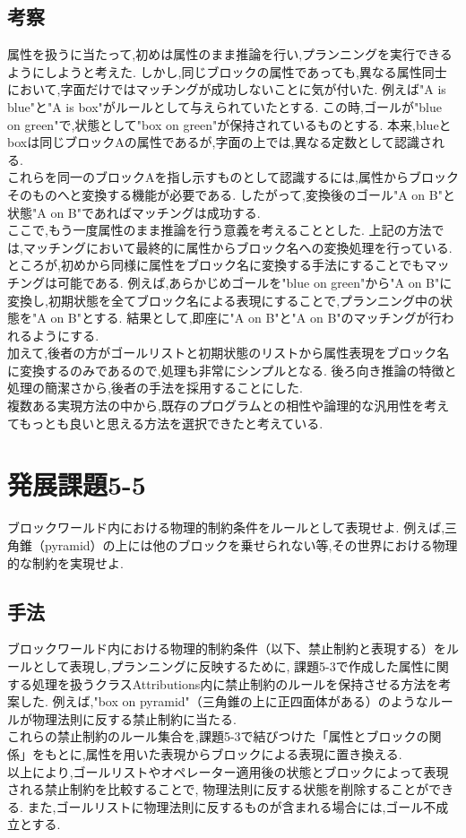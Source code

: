 \documentclass[uplatex,12pt]{jsarticle}
\begin{document}
\subsection{考察}
属性を扱うに当たって,初めは属性のまま推論を行い,プランニングを実行できるようにしようと考えた.
しかし,同じブロックの属性であっても,異なる属性同士において,字面だけではマッチングが成功しないことに気が付いた.
例えば"A is blue"と"A is box"がルールとして与えられていたとする.
この時,ゴールが"blue on green"で,状態として"box on green"が保持されているものとする.
本来,blueとboxは同じブロックAの属性であるが,字面の上では,異なる定数として認識される. \\
これらを同一のブロックAを指し示すものとして認識するには,属性からブロックそのものへと変換する機能が必要である.
したがって,変換後のゴール"A on B"と状態"A on B"であればマッチングは成功する. \\
ここで,もう一度属性のまま推論を行う意義を考えることとした.
上記の方法では,マッチングにおいて最終的に属性からブロック名への変換処理を行っている.
ところが,初めから同様に属性をブロック名に変換する手法にすることでもマッチングは可能である.
例えば,あらかじめゴールを"blue on green"から"A on B"に変換し,初期状態を全てブロック名による表現にすることで,プランニング中の状態を"A on B"とする.
結果として,即座に"A on B"と"A on B"のマッチングが行われるようにする. \\
加えて,後者の方がゴールリストと初期状態のリストから属性表現をブロック名に変換するのみであるので,処理も非常にシンプルとなる.
後ろ向き推論の特徴と処理の簡潔さから,後者の手法を採用することにした. \\
複数ある実現方法の中から,既存のプログラムとの相性や論理的な汎用性を考えてもっとも良いと思える方法を選択できたと考えている.


\section{発展課題5-5}
\begin{screen}
    ブロックワールド内における物理的制約条件をルールとして表現せよ.
    例えば,三角錐（pyramid）の上には他のブロックを乗せられない等,その世界における物理的な制約を実現せよ.
\end{screen}
\subsection{手法}
ブロックワールド内における物理的制約条件（以下、禁止制約と表現する）をルールとして表現し,プランニングに反映するために,
課題5-3で作成した属性に関する処理を扱うクラスAttributions内に禁止制約のルールを保持させる方法を考案した.
例えば,"box on pyramid"（三角錐の上に正四面体がある）のようなルールが物理法則に反する禁止制約に当たる. \\
これらの禁止制約のルール集合を,課題5-3で結びつけた「属性とブロックの関係」をもとに,属性を用いた表現からブロックによる表現に置き換える. \\
以上により,ゴールリストやオペレーター適用後の状態とブロックによって表現される禁止制約を比較することで,
物理法則に反する状態を削除することができる.
また,ゴールリストに物理法則に反するものが含まれる場合には,ゴール不成立とする.
\end{document}

